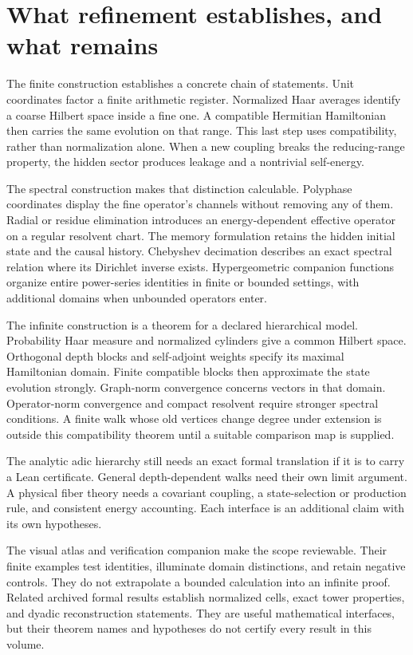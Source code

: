 \clearpage
\section{What refinement establishes, and what remains}
\label{a-conclusion}
The finite construction establishes a concrete chain of statements. Unit coordinates factor a finite arithmetic register. Normalized Haar averages identify a coarse Hilbert space inside a fine one. A compatible Hermitian Hamiltonian then carries the same evolution on that range. This last step uses compatibility, rather than normalization alone. When a new coupling breaks the reducing-range property, the hidden sector produces leakage and a nontrivial self-energy.

The spectral construction makes that distinction calculable. Polyphase coordinates display the fine operator's channels without removing any of them. Radial or residue elimination introduces an energy-dependent effective operator on a regular resolvent chart. The memory formulation retains the hidden initial state and the causal history. Chebyshev decimation describes an exact spectral relation where its Dirichlet inverse exists. Hypergeometric companion functions organize entire power-series identities in finite or bounded settings, with additional domains when unbounded operators enter.

The infinite construction is a theorem for a declared hierarchical model. Probability Haar measure and normalized cylinders give a common Hilbert space. Orthogonal depth blocks and self-adjoint weights specify its maximal Hamiltonian domain. Finite compatible blocks then approximate the state evolution strongly. Graph-norm convergence concerns vectors in that domain. Operator-norm convergence and compact resolvent require stronger spectral conditions. A finite walk whose old vertices change degree under extension is outside this compatibility theorem until a suitable comparison map is supplied.

\begin{readerroadmap}[title={The remaining research interfaces}]
The analytic adic hierarchy still needs an exact formal translation if it is to carry a Lean certificate. General depth-dependent walks need their own limit argument. A physical fiber theory needs a covariant coupling, a state-selection or production rule, and consistent energy accounting. Each interface is an additional claim with its own hypotheses.
\end{readerroadmap}

The visual atlas and verification companion make the scope reviewable. Their finite examples test identities, illuminate domain distinctions, and retain negative controls. They do not extrapolate a bounded calculation into an infinite proof. Related archived formal results establish normalized cells, exact tower properties, and dyadic reconstruction statements. They are useful mathematical interfaces, but their theorem names and hypotheses do not certify every result in this volume.

